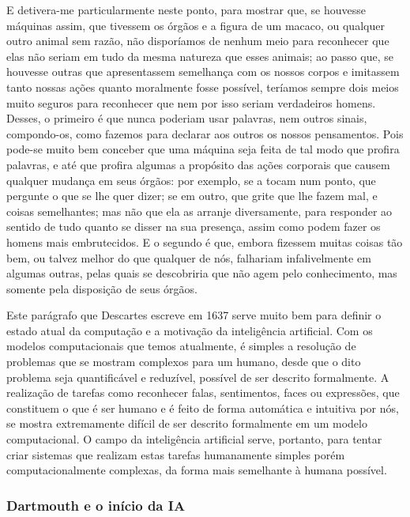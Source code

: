 \documentclass[12pt, a4paper]{article}
\begin{document}
\begin{displayquote}
E detivera-me particularmente neste ponto, para mostrar que, se houvesse máquinas assim, que tivessem os órgãos e a figura de um macaco,
ou qualquer outro animal sem razão, não disporíamos de nenhum meio para reconhecer que elas não seriam em tudo da mesma natureza que esses animais;
ao passo que, se houvesse outras que apresentassem semelhança com os nossos corpos e imitassem tanto nossas ações quanto moralmente fosse possível,
teríamos sempre dois meios muito seguros para reconhecer que nem por isso seriam verdadeiros homens. Desses, o primeiro é que nunca poderiam usar palavras,
nem outros sinais, compondo-os, como fazemos para declarar aos outros os nossos pensamentos. Pois pode-se muito bem conceber que uma máquina seja feita de tal modo que profira palavras, e até que profira algumas a propósito das ações corporais que causem qualquer mudança em seus órgãos: por exemplo,
se a tocam num ponto, que pergunte o que se lhe quer dizer; se em outro, que grite que lhe fazem mal, e coisas semelhantes;
mas não que ela as arranje diversamente, para responder ao sentido de tudo quanto se disser na sua presença, assim como podem fazer os homens mais embrutecidos. E o segundo é que, embora fizessem muitas coisas tão bem, ou talvez melhor do que qualquer de nós, falhariam infalivelmente em algumas outras,
pelas quais se descobriria que não agem pelo conhecimento, mas somente pela disposição de seus órgãos. \cite{descartes}
\end{displayquote}

Este parágrafo que Descartes escreve em 1637 serve muito bem para definir o estado atual da computação e a motivação da inteligência artificial.
Com os modelos computacionais que temos atualmente, 
é simples a resolução de problemas que se mostram complexos para um humano, 
desde que o dito problema seja quantificável e reduzível, possível de ser descrito formalmente.
A realização de tarefas como reconhecer falas, sentimentos, faces ou expressões, que constituem o que é ser humano e é feito de forma
automática e intuitiva por nós, se mostra extremamente difícil de ser descrito formalmente em um modelo computacional.
O campo da inteligência artificial serve, portanto, para tentar criar sistemas que realizam estas tarefas humanamente simples porém 
computacionalmente complexas, da forma mais semelhante à humana possível.

\subsubsection{Dartmouth e o início da IA}
\end{document}
